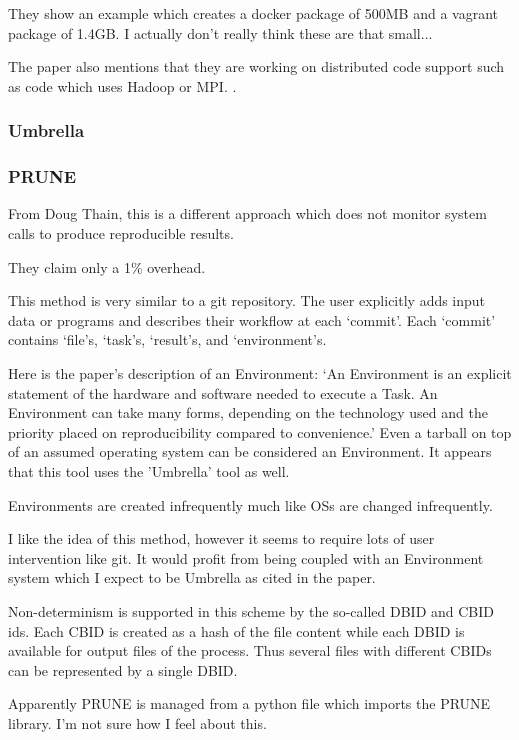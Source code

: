 \documentclass[american]{article}
\begin{document}
They show an example which creates a docker package of 500MB and a vagrant package of 1.4GB. I actually don't really think these are that small...

The paper also mentions that they are working on distributed code support such as code which uses Hadoop or MPI. \cite{reprozip}.

\subsubsection{Umbrella} \label{sec:umbrella}


\subsubsection{PRUNE} \label{sec:prune}

From Doug Thain, this is a different approach which does not monitor system calls to produce reproducible results.

They claim only a 1\% overhead.

This method is very similar to a git repository. The user explicitly adds input data or programs and describes their workflow at each `commit'. Each `commit' contains `file's, `task's, `result's, and `environment's.

Here is the paper's description of an Environment: `An Environment is an explicit statement of the hardware and software needed to execute a Task. An Environment can take many forms, depending on the technology used and the priority placed on reproducibility compared to convenience.' Even a tarball on top of an assumed operating system can be considered an Environment. It appears that this tool uses the 'Umbrella' tool as well.

Environments are created infrequently much like OSs are changed infrequently.

I like the idea of this method, however it seems to require lots of user intervention like git. It would profit from being coupled with an Environment system which I expect to be Umbrella as cited in the paper.

Non-determinism is supported in this scheme by the so-called DBID and CBID ids. Each CBID is created as a hash of the file content while each DBID is available for output files of the process. Thus several files with different CBIDs can be represented by a single DBID.

Apparently PRUNE is managed from a python file which imports the PRUNE library. I'm not sure how I feel about this.
\end{document}
